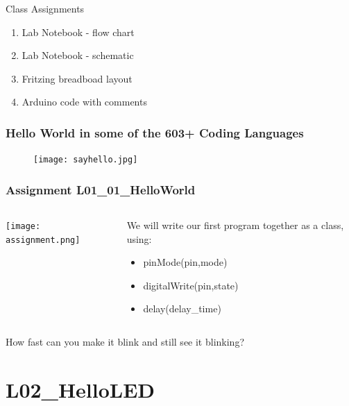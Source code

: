 \documentclass{beamer}
\begin{document}
\begin{frame}{Class Assignments}
\begin{enumerate}
\item Lab Notebook - flow chart
\item Lab Notebook - schematic
\item Fritzing breadboad layout
\item Arduino code with comments
\lstb
\end{enumerate}
\end{frame}

\begin{frame}\frametitle{Hello World in some of the 603+ Coding Languages}
\begin{figure}[h]
	\texttt{[image: sayhello.jpg]}
\end{figure}
\end{frame}

\begin{frame}
\frametitle{Assignment L01\_01\_HelloWorld}
\begin{columns}
\begin{column}{4cm}
\begin{overprint}
\texttt{[image: assignment.png]}
\end{overprint}
\end{column}
\begin{column}{6cm}
We will write our first program together as a class, using:
\begin{itemize}
\item pinMode(pin,mode)
\item digitalWrite(pin,state)
\item delay(delay\_time)
\end{itemize}
\end{column}
\end{columns}

\vspace{0.5cm}

How fast can you make it blink and still see it blinking?
\end{frame}

\section{L02\_HelloLED}

\end{document}
